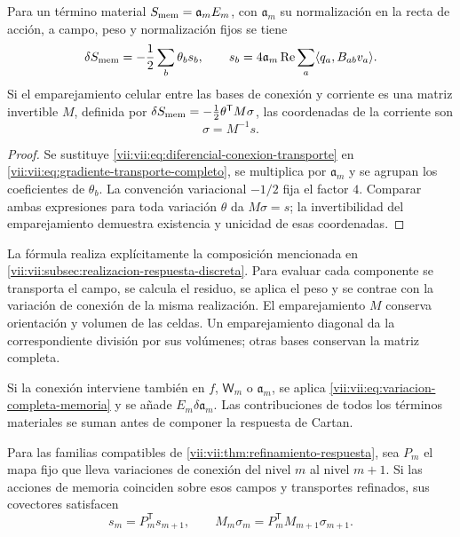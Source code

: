 \begin{theorem}
\label{vii:vii:thm:corriente-conexion-evaluada}
Para un término material \(S_{\rm mem}=\mathfrak a_m E_m\),
con \(\mathfrak a_m\) su normalización en la recta de acción,
a campo, peso y normalización fijos se tiene
\begin{equation}
 \delta S_{\rm mem}=-\frac12\sum_b\theta_b s_b,\qquad
 s_b=4\mathfrak a_m\operatorname{Re}
        \sum_a\langle q_a,B_{ab}v_a\rangle.
 \label{vii:vii:eq:componentes-corriente-conexion}
\end{equation}
Si el emparejamiento celular entre las bases de conexión y corriente
es una matriz invertible \(M\), definida por
\(\delta S_{\rm mem}=-\tfrac12\theta^{\mathsf T}M\sigma\),
las coordenadas de la corriente son
\begin{equation}
 \sigma=M^{-1}s.
 \label{vii:vii:eq:coordenadas-corriente-material}
\end{equation}
\end{theorem}

\begin{proof}
Se sustituye \eqref{vii:vii:eq:diferencial-conexion-transporte} en
\eqref{vii:vii:eq:gradiente-transporte-completo}, se multiplica por
\(\mathfrak a_m\) y se agrupan los coeficientes de
\(\theta_b\). La convención variacional \(-1/2\) fija el
factor \(4\). Comparar ambas expresiones para toda variación
\(\theta\) da \(M\sigma=s\); la invertibilidad del
emparejamiento demuestra existencia y unicidad de esas coordenadas.
\end{proof}

La fórmula realiza explícitamente la composición mencionada en
\ref{vii:vii:subsec:realizacion-respuesta-discreta}. Para evaluar cada
componente se transporta el campo, se calcula el residuo, se aplica el
peso y se contrae con la variación de conexión de la misma realización.
El emparejamiento \(M\) conserva orientación y volumen de las celdas.
Un emparejamiento diagonal da la correspondiente división por sus
volúmenes; otras bases conservan la matriz completa.

Si la conexión interviene también en \(f\), \(\mathsf W_m\)
o \(\mathfrak a_m\), se aplica
\eqref{vii:vii:eq:variacion-completa-memoria} y se añade
\(E_m\delta\mathfrak a_m\). Las contribuciones de todos los
términos materiales se suman antes de componer la respuesta de Cartan.

\begin{corollary}
\label{vii:vii:cor:refinamiento-corriente-conexion}
Para las familias compatibles de
\ref{vii:vii:thm:refinamiento-respuesta}, sea \(P_m\) el mapa fijo
que lleva variaciones de conexión del nivel \(m\) al nivel
\(m+1\). Si las acciones de memoria coinciden sobre esos campos
y transportes refinados, sus covectores satisfacen
\[
 s_m=P_m^{\mathsf T}s_{m+1},\qquad
 M_m\sigma_m=P_m^{\mathsf T}M_{m+1}\sigma_{m+1}.
\]
\end{corollary}

